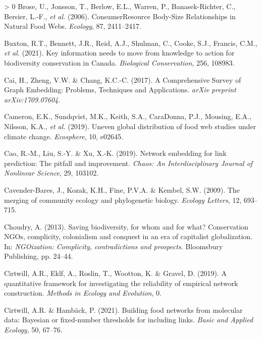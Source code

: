 \documentclass[11pt]{article}
\newlength{\cslhangindent}
\newenvironment{CSLReferences}[3] %
 {%
  \setlength{\parindent}{0pt}
  \ifodd #1 \everypar{\setlength{\hangindent}{\cslhangindent}}\ignorespaces\fi
  \ifnum #2 > 0
  \setlength{\parskip}{#2\baselineskip}
  \fi
 }%
 {}
\begin{document}
\begin{CSLReferences}{1}{0}
\leavevmode\hypertarget{ref-Brose2006ConRes}{}%
Brose, U., Jonsson, T., Berlow, E.L., Warren, P., Banasek-Richter, C.,
Bersier, L.-F., \emph{et al.} (2006). ConsumerResource Body-Size
Relationships in Natural Food Webs. \emph{Ecology}, 87, 2411--2417.

\leavevmode\hypertarget{ref-Buxton2021KeyInf}{}%
Buxton, R.T., Bennett, J.R., Reid, A.J., Shulman, C., Cooke, S.J.,
Francis, C.M., \emph{et al.} (2021). Key information needs to move from
knowledge to action for biodiversity conservation in Canada.
\emph{Biological Conservation}, 256, 108983.

\leavevmode\hypertarget{ref-Cai2017ComSur}{}%
Cai, H., Zheng, V.W. \& Chang, K.C.-C. (2017). A Comprehensive Survey of
Graph Embedding: Problems, Techniques and Applications. \emph{arXiv
preprint arXiv:1709.07604}.

\leavevmode\hypertarget{ref-Cameron2019UneGlo}{}%
Cameron, E.K., Sundqvist, M.K., Keith, S.A., CaraDonna, P.J., Mousing,
E.A., Nilsson, K.A., \emph{et al.} (2019). Uneven global distribution of
food web studies under climate change. \emph{Ecosphere}, 10, e02645.

\leavevmode\hypertarget{ref-Cao2019NetEmb}{}%
Cao, R.-M., Liu, S.-Y. \& Xu, X.-K. (2019). Network embedding for link
prediction: The pitfall and improvement. \emph{Chaos: An
Interdisciplinary Journal of Nonlinear Science}, 29, 103102.

\leavevmode\hypertarget{ref-Cavender-Bares2009MerCom}{}%
Cavender-Bares, J., Kozak, K.H., Fine, P.V.A. \& Kembel, S.W. (2009).
The merging of community ecology and phylogenetic biology. \emph{Ecology
Letters}, 12, 693--715.

\leavevmode\hypertarget{ref-Choudry2013SavBio}{}%
Choudry, A. (2013). Saving biodiversity, for whom and for what?
Conservation NGOs, complicity, colonialism and conquest in an era of
capitalist globalization. In: \emph{NGOization: Complicity,
contradictions and prospects}. Bloomsbury Publishing, pp. 24--44.

\leavevmode\hypertarget{ref-Cirtwill2019QuaFra}{}%
Cirtwill, A.R., Eklf, A., Roslin, T., Wootton, K. \& Gravel, D. (2019).
A quantitative framework for investigating the reliability of empirical
network construction. \emph{Methods in Ecology and Evolution}, 0.

\leavevmode\hypertarget{ref-Cirtwill2021BuiFoo}{}%
Cirtwill, A.R. \& Hambäck, P. (2021). Building food networks from
molecular data: Bayesian or fixed-number thresholds for including links.
\emph{Basic and Applied Ecology}, 50, 67--76.


\end{CSLReferences}
\end{document}
